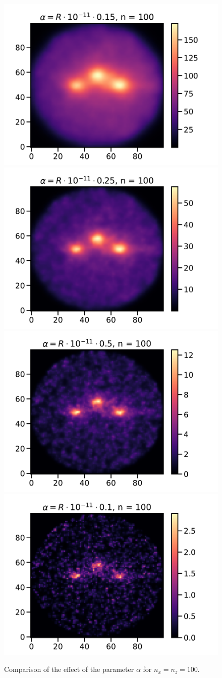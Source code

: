 \documentclass[a4paper,12pt]{article}
\begin{document}
\begin{figure}[H]
    \includegraphics[width=.6\textwidth]{../img-mpi/graph100-0.pdf}\hfill
    \includegraphics[width=.6\textwidth]{../img-mpi/graph100-1.pdf}\hfill
    \\[\smallskipamount]
    \includegraphics[width=.6\textwidth]{../img-mpi/graph100-2.pdf}\hfill
    \includegraphics[width=.6\textwidth]{../img-mpi/graph100-3.pdf}
    \caption{Comparison of the effect of the parameter \(\alpha\)
    for \(n_x = n_z = 100\).}
\end{figure}
\end{document}
